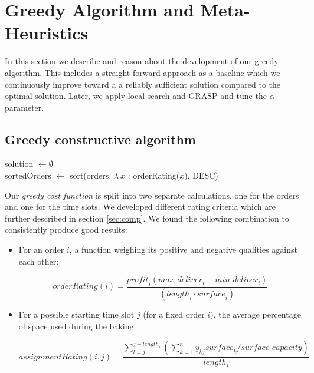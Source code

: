 \documentclass{article}
\begin{document}
\section{Greedy Algorithm and Meta-Heuristics}
In this section we describe and reason about the development of our greedy algorithm. This includes a straight-forward approach as a baseline which we continuously improve toward a 
a reliably sufficient solution compared to the optimal solution. Later, we apply local search and GRASP and tune the $\alpha$ parameter.
\subsection{Greedy constructive algorithm}\label{it:greedy_cost}
\begin{center}
\begin{algorithm}[H]
solution $\gets \emptyset$ \\
sortedOrders $\gets$ sort(orders, $\lambda \: x$ : orderRating($x$), DESC) \\
\;
\end{algorithm}
\end{center}

Our \textit{greedy cost function} is split into two separate calculations, one for the orders and one for the time slots.
We developed different rating criteria which are further described in section \ref{sec:comp}. We found the following combination to consistently produce good results:
\begin{itemize}
    \item For an order $i$, a function weighing its positive and negative qualities against each other:
        \begin{center}
            $$\mathit{orderRating}(i) = \frac{\mathit{profit}_i (\mathit{max\_deliver}_i - \mathit{min\_deliver}_i)}{(\mathit{length}_i \cdot \mathit{surface}_i)}$$
        \end{center} 
    \item For a possible starting time slot $j$ (for a fixed order $i$), the average percentage of space used during the baking
        \begin{center}
            $$\mathit{assignmentRating}(i,j) = \frac{\sum_{l=j}^{j + \mathit{length}_i} (\sum_{k=1}^n y_{kj} \mathit{surface}_k / \mathit{surface\_capacity})}{\mathit{length}_i}$$
        \end{center}
\end{itemize}
\end{document}
